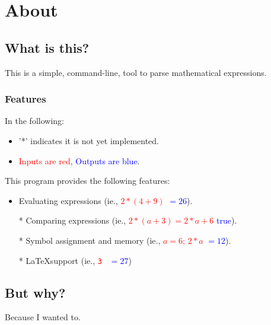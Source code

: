 \chapter{About}
    \section{What is this?}
        This is a simple, command-line, tool to parse mathematical expressions. 

        \subsection*{Features}
            In the following:
            \begin{itemize}
                \item '*' indicates it is not yet implemented.
                \item \textcolor{red}{Inputs are red}, \textcolor{blue}{Outputs are blue}.
            \end{itemize}

            \noindent This program provides the following features:
            \begin{itemize}
                \item Evaluating expressions (ie., \textcolor{red}{$2 * (4 + 9)$} \textcolor{blue}{$= 26$}).
                \item[*] Comparing expressions (ie., \textcolor{red}{$2 * (a + 3) = 2 * a + 6$} \textcolor{blue}{true}).
                \item[*] Symbol assignment and memory (ie., \textcolor{red}{$a = 6$; $2 * a$} \textcolor{blue}{$= 12$}).
                \item[*] \LaTeX support (ie., \textcolor{red}{\texttt{3 }} \textcolor{blue}{$= 27$}) 
            \end{itemize}

    \section{But why?}
        Because I wanted to.
